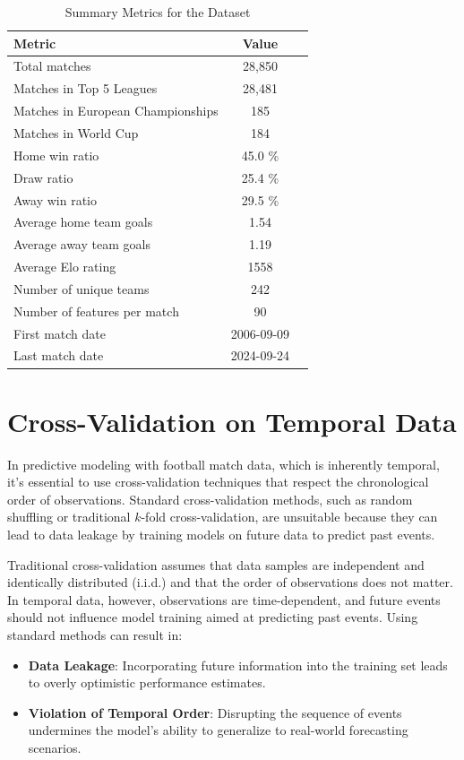 \begin{table}[h]
\centering
\begin{tabular}{|l|c|c|}
\hline
\textbf{Metric} & \textbf{Value} \\
\hline
Total matches & 28,850 \\
Matches in Top 5 Leagues & 28,481 \\
Matches in European Championships & 185 \\
Matches in World Cup & 184 \\
Home win ratio & 45.0 \% \\
Draw ratio & 25.4 \% \\
Away win ratio & 29.5 \% \\ 
Average home team goals & 1.54 \\
Average away team goals & 1.19 \\
Average Elo rating & 1558 \\
Number of unique teams & 242 \\
Number of features per match & 90 \\
First match date & 2006-09-09 \\
Last match date & 2024-09-24 \\
\hline
\end{tabular}
\caption{Summary Metrics for the Dataset}
\end{table}


\section{Cross-Validation on Temporal Data}
\label{sec:cross_validation_temporal}

In predictive modeling with football match data, which is inherently temporal, it's essential to use cross-validation techniques that respect the chronological order of observations. Standard cross-validation methods, such as random shuffling or traditional \( k \)-fold cross-validation, are unsuitable because they can lead to data leakage by training models on future data to predict past events.

Traditional cross-validation assumes that data samples are independent and identically distributed (i.i.d.) and that the order of observations does not matter. In temporal data, however, observations are time-dependent, and future events should not influence model training aimed at predicting past events. Using standard methods can result in:

\begin{itemize}
    \item \textbf{Data Leakage}: Incorporating future information into the training set leads to overly optimistic performance estimates.
    \item \textbf{Violation of Temporal Order}: Disrupting the sequence of events undermines the model's ability to generalize to real-world forecasting scenarios.
\end{itemize}


